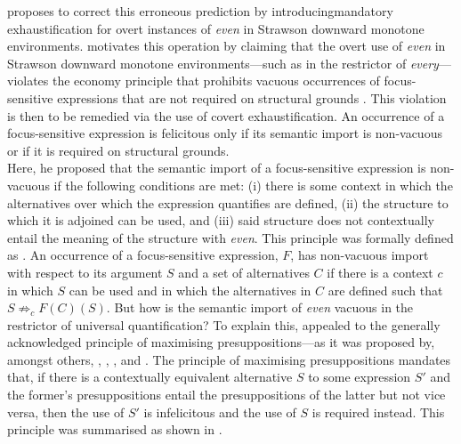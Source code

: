 \textcite{Crnic2014-dogma,Crnic2014-nm} proposes to correct this erroneous prediction by introducing\linebreak mandatory exhaustification for overt instances of \textit{even} in Strawson downward monotone environments. \textcite{Crnic2014-dogma,Crnic2014-nm} motivates this operation by claiming that the overt use of \textit{even} in Strawson downward monotone environments---such as in the restrictor of \textit{every}---violates the economy principle that prohibits vacuous occurrences of focus-sensitive expressions that are not required on structural grounds \parencite{Crnic2011-meaning,Spector2013}. This violation is then to be remedied via the use of covert exhaustification.
\ex{}
{}
An occurrence of a focus-sensitive expression is felicitous only if its semantic import is non-vacuous or if it is required on structural grounds.\\\emptyfill\parencite[p.~133]{Crnic2014-dogma}
\xe
Here, he proposed that the semantic import of a focus-sensitive expression is non-vacuous if the following conditions are met: (i) there is some context in which the alternatives over which the expression quantifies are defined, (ii) the structure to which it is adjoined can be used, and (iii) said structure does not contextually entail the meaning of the structure with \textit{even}. This principle was formally defined as .
\ex{}
{}
An occurrence of a focus-sensitive expression, $F$, has non-vacuous import with respect to
its argument $S$ and a set of alternatives $C$ if there is a context $c$ in which $S$ can be used and
in which the alternatives in $C$ are defined such that $S\not\Rightarrow_c F(C)(S)$.\hfill\parencite[p.~134]{Crnic2014-dogma}
\xe
But how is the semantic import of \textit{even} vacuous in the restrictor of universal quantification? To explain this, \textcite{Crnic2014-dogma} appealed to the generally acknowledged principle of maximising presuppositions---as it was proposed by, amongst others, \textcite{Heim1991}, \textcite{Percus2006}, \textcite{Sauerland2006}, and \textcite{Singh2011}. The principle of maximising presuppositions mandates that, if there is a contextually equivalent alternative $S$ to some expression $S'$ and the former's presuppositions entail the presuppositions of the latter but not vice versa, then the use of $S'$ is infelicitous and the use of $S$ is required instead. This principle was summarised as shown in .
